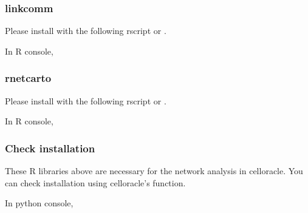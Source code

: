 \documentclass[letterpaper,10pt,english]{sphinxmanual}
\begin{document}
\subsubsection{linkcomm}
\label{\detokenize{installation/index:id8}}
Please install  with the following r\sphinxhyphen{}script or  .

In R console,

\begin{sphinxVerbatim}[commandchars=\\\{\}]
\end{sphinxVerbatim}


\subsubsection{rnetcarto}
\label{\detokenize{installation/index:id10}}
Please install  with the following r\sphinxhyphen{}script or  .

In R console,

\begin{sphinxVerbatim}[commandchars=\\\{\}]
\end{sphinxVerbatim}


\subsubsection{Check installation}
\label{\detokenize{installation/index:check-installation}}
These R libraries above are necessary for the network analysis in celloracle. You can check installation using celloracle’s function.

In python console,

\begin{sphinxVerbatim}[commandchars=\\\{\}]
   
\end{sphinxVerbatim}
\end{document}

